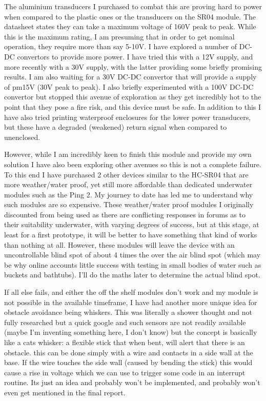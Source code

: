 \documentclass[11pt,a4paper,titlepage]{report}
\begin{document}
	The aluminium transducers I purchased to combat this are proving hard to power when compared to the plastic ones or the transducers on the SR04 module. The datasheet states they can take a maximum voltage of 160\unit{\volt} peak to peak. While this is the maximum rating, I am presuming that in order to get nominal operation, they require more than say 5-10\unit{\volt}. I have explored a number of DC-DC convertors to provide more power. I have tried this with a 12\unit{\volt} supply, and more recently with a 30\unit{\volt} supply, with the latter providing some briefly promising results. I am also waiting for a 30\unit{\volt} DC-DC convertor that will provide a supply of \unit{\pm}15V (30\unit{\volt} peak to peak). I also briefly experimented with a 100\unit{\volt} DC-DC convertor but stopped this avenue of exploration as they get incredibly hot to the point that they pose a fire risk, and this device must be safe. In addition to this I have also tried printing waterproof enclosures for the lower power transducers, but these have a degraded (weakened) return signal when compared to unenclosed. 
	
	However, while I am incredibly keen to finish this module and provide my own solution I have also been exploring other avenues so this is not a complete failure. To this end I have purchased 2 other devices similar to the HC-SR04 that are more weather/water proof, yet still more affordable than dedicated underwater modules such as the Ping 2\cite{PING2}. My journey to date has led me to understand why such modules are so expensive. These weather/water proof modules I originally discounted from being used as there are conflicting responses in forums as to their suitability underwater, with varying degrees of success, but at this stage, at least for a first prototype, it will be better to have something that kind of works than nothing at all. However, these modules will leave the device with an uncontrollable blind spot of about 4 times the over the air blind spot (which may be why online accounts little success with testing in small bodies of water such as buckets and bathtubs). I'll do the maths later to determine the actual blind spot. 
	
	If all else fails, and either the off the shelf modules don't work and my module is not possible in the available timeframe, I have had another more unique idea for obstacle avoidance being whiskers. This was literally a shower thought and not fully researched but a quick google and such sensors are not readily available (maybe I'm inventing something here, I don't know) but the concept is basically like a cats whisker: a flexible stick that when bent, will alert that there is an obstacle. this can be done simply with a wire and contacts in a side wall at the base. If the wire touches the side wall (caused by bending the stick) this would cause a rise in voltage which we can use to trigger some code in an interrupt routine. Its just an idea and probably won't be implemented, and probably won't even get mentioned in the final report. 
	
\end{document}
